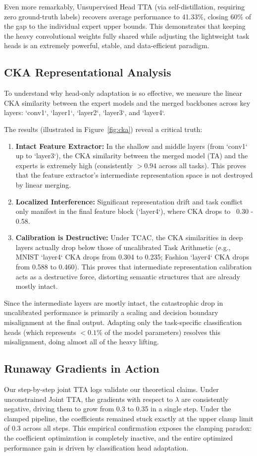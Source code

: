 \documentclass{article}
\theoremstyle{plain}
\theoremstyle{definition}
\theoremstyle{remark}
\begin{document}
Even more remarkably, Unsupervised Head TTA (via self-distillation, requiring zero ground-truth labels) recovers average performance to 41.33\%, closing 60\% of the gap to the individual expert upper bounds. This demonstrates that keeping the heavy convolutional weights fully shared while adjusting the lightweight task heads is an extremely powerful, stable, and data-efficient paradigm.

\subsection{CKA Representational Analysis}
To understand why head-only adaptation is so effective, we measure the linear CKA similarity between the expert models and the merged backbones across key layers: `conv1`, `layer1`, `layer2`, `layer3`, and `layer4`.

The results (illustrated in Figure~\ref{fig:cka}) reveal a critical truth:
\begin{enumerate}
  \item \textbf{Intact Feature Extractor:} In the shallow and middle layers (from `conv1` up to `layer3`), the CKA similarity between the merged model (TA) and the experts is extremely high (consistently $>0.94$ across all tasks). This proves that the feature extractor's intermediate representation space is not destroyed by linear merging.
  \item \textbf{Localized Interference:} Significant representation drift and task conflict only manifest in the final feature block (`layer4`), where CKA drops to ~0.30 - 0.58.
  \item \textbf{Calibration is Destructive:} Under TCAC, the CKA similarities in deep layers actually drop below those of uncalibrated Task Arithmetic (e.g., MNIST `layer4` CKA drops from 0.304 to 0.235; Fashion `layer4` CKA drops from 0.588 to 0.460). This proves that intermediate representation calibration acts as a destructive force, distorting semantic structures that are already mostly intact.
\end{enumerate}

Since the intermediate layers are mostly intact, the catastrophic drop in uncalibrated performance is primarily a scaling and decision boundary misalignment at the final output. Adapting only the task-specific classification heads (which represents $< 0.1\%$ of the model parameters) resolves this misalignment, doing almost all of the heavy lifting.

\subsection{Runaway Gradients in Action}
Our step-by-step joint TTA logs validate our theoretical claims. Under unconstrained Joint TTA, the gradients with respect to $\lambda$ are consistently negative, driving them to grow from 0.3 to 0.35 in a single step. Under the clamped pipeline, the coefficients remained stuck exactly at the upper clamp limit of 0.3 across all steps. This empirical confirmation exposes the clamping paradox: the coefficient optimization is completely inactive, and the entire optimized performance gain is driven by classification head adaptation.
\end{document}
